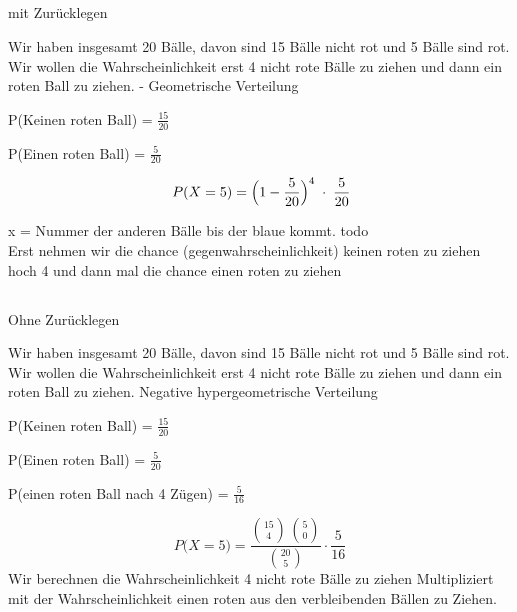 \subsection*{\centering{}}
\begin{center}
\normalsize
\textcolor{red}{\warning}\textcolor{red}{\warning} mit Zurücklegen \textcolor{red}{\warning}\textcolor{red}{\warning}
\end{center}
\normalsize

Wir haben insgesamt 20 Bälle, davon sind 15 Bälle nicht rot
und 5 Bälle sind rot. Wir wollen die Wahrscheinlichkeit erst 4
nicht rote Bälle zu ziehen und dann ein roten Ball zu ziehen. - Geometrische Verteilung
\begin{mdframed}[linecolor=yellow, linewidth=2pt]
P(Keinen roten Ball) = $\frac{15}{20}$

P(Einen roten Ball) = $\frac{5}{20}$
\end{mdframed}
\large{
\[\;P(X = 5)
= \Bigl(1 - \frac{5}{20}\Bigr)^{4}
\;\cdot\;\frac{5}{20}
\]}
\normalsize
{}
x = Nummer der anderen Bälle bis der 
blaue kommt. todo
\\Erst nehmen wir die chance (gegenwahrscheinlichkeit) keinen roten zu ziehen hoch 4 und dann mal die chance einen roten zu ziehen

\subsection*{\centering{}}
\begin{center}
\normalsize
\textcolor{red}{\warning}\textcolor{red}{\warning} Ohne Zurücklegen \textcolor{red}{\warning}\textcolor{red}{\warning}
\end{center}
\normalsize
Wir haben insgesamt 20 Bälle, davon sind 15 Bälle nicht rot und 5 Bälle sind rot.
Wir wollen die Wahrscheinlichkeit erst 4 nicht rote Bälle zu ziehen und dann ein roten Ball zu ziehen. Negative hypergeometrische Verteilung
\begin{tcolorbox}[colback=white,colframe=yellow,sharp corners]
P(Keinen roten Ball) = $\frac{15}{20}$

P(Einen roten Ball) = $\frac{5}{20}$

P(einen roten Ball nach 4 Zügen) = $\frac{5}{16}$

\end{tcolorbox}
\[
P\bigl(X = 5\bigr)
= \frac{\binom{15}{4}\,\binom{5}{0}}{\binom{20}{5}} \cdot \frac{5}{16}
\]
\normalsize
Wir berechnen die Wahrscheinlichkeit 4 nicht rote Bälle zu ziehen Multipliziert mit der Wahrscheinlichkeit einen roten aus den verbleibenden Bällen zu Ziehen.
